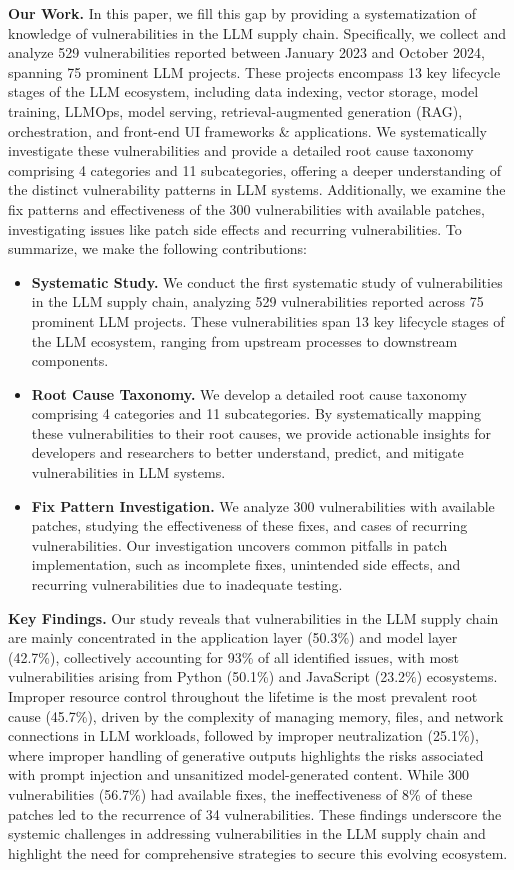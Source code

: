 \noindent \textbf{Our Work.} In this paper, we fill this gap by providing a systematization of knowledge of vulnerabilities in the LLM supply chain. Specifically, we collect and analyze 529 vulnerabilities reported between January 2023 and October 2024, spanning 75 prominent LLM projects. These projects encompass 13 key lifecycle stages of the LLM ecosystem, including data indexing, vector storage, model training, LLMOps, model serving, retrieval-augmented generation (RAG), orchestration, and front-end UI frameworks \& applications. We systematically investigate these vulnerabilities and provide a detailed root cause taxonomy comprising 4 categories and 11 subcategories, offering a deeper understanding of the distinct vulnerability patterns in LLM systems. Additionally, we examine the fix patterns and effectiveness of the 300 vulnerabilities with available patches, investigating issues like patch side effects and recurring vulnerabilities. To summarize, we make the following contributions:
\begin{itemize}[leftmargin=10pt]
    \item \textbf{Systematic Study.} We conduct the first systematic study of vulnerabilities in the LLM supply chain, analyzing 529 vulnerabilities reported across 75 prominent LLM projects. These vulnerabilities span 13 key lifecycle stages of the LLM ecosystem, ranging from upstream processes to downstream components.
    \item \textbf{Root Cause Taxonomy.} We develop a detailed root cause taxonomy comprising 4 categories and 11 subcategories. By systematically mapping these vulnerabilities to their root causes, we provide actionable insights for developers and researchers to better understand, predict, and mitigate vulnerabilities in LLM systems.
    \item \textbf{Fix Pattern Investigation.} We analyze 300 vulnerabilities with available patches, studying the effectiveness of these fixes, and cases of recurring vulnerabilities. Our investigation uncovers common pitfalls in patch implementation, such as incomplete fixes, unintended side effects, and recurring vulnerabilities due to inadequate testing.
\end{itemize}

\noindent \textbf{Key Findings.}
Our study reveals that vulnerabilities in the LLM supply chain are mainly concentrated in the application layer (50.3\%) and model layer (42.7\%), collectively accounting for 93\% of all identified issues, with most vulnerabilities arising from Python (50.1\%) and JavaScript (23.2\%) ecosystems. Improper resource control throughout the lifetime is the most prevalent root cause (45.7\%), driven by the complexity of managing memory, files, and network connections in LLM workloads, followed by improper neutralization (25.1\%), where improper handling of generative outputs highlights the risks associated with prompt injection and unsanitized model-generated content. While 300 vulnerabilities (56.7\%) had available fixes, the ineffectiveness of 8\% of these patches led to the recurrence of 34 vulnerabilities. These findings underscore the systemic challenges in addressing vulnerabilities in the LLM supply chain and highlight the need for comprehensive strategies to secure this evolving ecosystem.